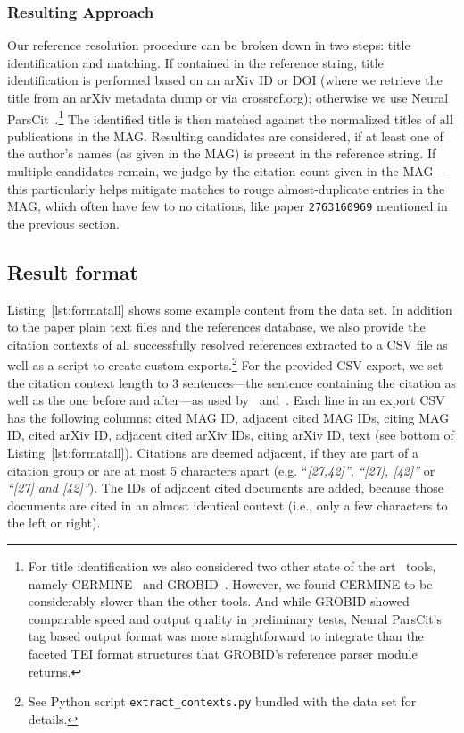 \subsubsection{Resulting Approach}
Our reference resolution procedure can be broken down in two steps: title identification and matching. If contained in the reference string, title identification is performed based on an arXiv ID or DOI (where we retrieve the title from an arXiv metadata dump or via crossref.org); otherwise we use Neural ParsCit~\cite{neuralparscit}.\footnote{For title identification we also considered two other state of the art~\cite{Tkaczyk2018} tools, namely CERMINE~\cite{Tkaczyk2015} and GROBID~\cite{Lopez2009}. However, we found CERMINE to be considerably slower than the other tools. And while GROBID showed comparable speed and output quality in preliminary tests, Neural ParsCit's tag based output format was more straightforward to integrate than the faceted TEI format structures that GROBID's reference parser module returns.}
The identified title is then matched against the normalized titles of all publications in the MAG. Resulting candidates are considered, if at least one of the author's names (as given in the MAG) is present in the reference string. If multiple candidates remain, we judge by the citation count given in the MAG---this particularly helps mitigate matches to rouge almost-duplicate entries in the MAG, which often have few to no citations, like paper \texttt{2763160969} mentioned in the previous section.

\subsection{Result format}
Listing~\ref{lst:formatall} shows some example content from the data set. In addition to the paper plain text files and the references database, we also provide the citation contexts of all successfully resolved references extracted to a CSV file as well as a script to create custom exports.\footnote{See Python script \texttt{extract\_contexts.py} bundled with the data set for details.} For the provided CSV export, we set the citation context length to 3 sentences---the sentence containing the citation as well as the one before and after---as used by~\cite{Tang2014} and~\cite{Huang2015fixed}. Each line in an export CSV has the following columns: cited MAG ID, adjacent cited MAG IDs, citing MAG ID, cited arXiv ID, adjacent cited arXiv IDs, citing arXiv ID, text (see bottom of Listing~\ref{lst:formatall}). Citations are deemed adjacent, if they are part of a citation group or are at most 5 characters apart (e.g. ``\emph{[27,42]''}, \emph{``[27], [42]''} or \emph{``[27] and [42]''}). The IDs of adjacent cited documents are added, because those documents are cited in an almost identical context (i.e., only a few characters to the left or right).

